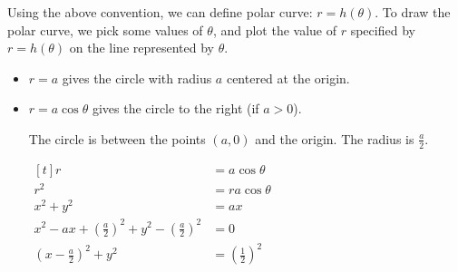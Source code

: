 Using the above convention, we can define polar curve: $r = h(\theta)$. To draw the polar curve, we pick some values of $\theta$, and plot the value of $r$ specified by $r = h(\theta)$ on the line represented by $\theta$.

\begin{itemize}
    \item $r = a$ gives the circle with radius $a$ centered at the origin.

    \begin{center}
    \end{center}

    \item $r = a\cos{\theta}$ gives the circle to the right (if $a > 0$).
    
    The circle is between the points $(a, 0)$ and the origin. The radius is $\frac{a}{2}$.

    $\begin{aligned}[t]
        r                                                                        & = a \cos{\theta}             \\
        r^2                                                                      & = r a \cos{\theta}           \\
        x^2 + y^2                                                                & = ax                         \\
        x^2 - ax + \left(\frac{a}{2}\right)^2 + y^2 - \left(\frac{a}{2}\right)^2 & = 0                          \\
        \left(x - \frac{a}{2}\right)^2 + y^2                                     & = \left(\frac{1}{2}\right)^2
    \end{aligned}$

    \begin{center}
\end{center}
\end{itemize}
